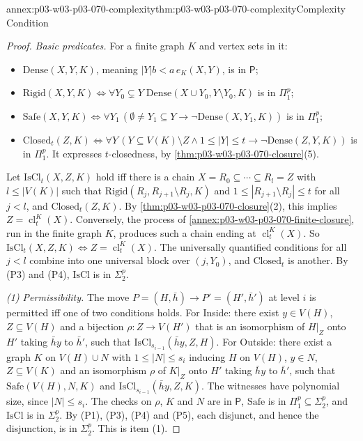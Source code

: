 \begin{annexitem}{annex:p03-w03-p03-070-complexity}{thm:p03-w03-p03-070-complexity}{Complexity Condition}
\begin{proof}
\emph{Basic predicates.}  For a finite graph \(K\) and vertex sets in it:
\begin{itemize}
\item \(\mathrm{Dense}(X,Y,K)\), meaning \(|Y|b<a\,e_K(X,Y)\), is in
      \(\mathsf P\);
\item \(\mathrm{Rigid}(X,Y,K)\iff\forall Y_0\subsetneq Y\;
      \mathrm{Dense}(X\cup Y_0,Y\setminus Y_0,K)\) is in \(\Pi^p_1\);
\item \(\mathrm{Safe}(X,Y,K)\iff\forall Y_1\,(\emptyset\neq Y_1\subseteq Y
      \to\neg\mathrm{Dense}(X,Y_1,K))\) is in \(\Pi^p_1\);
\item \(\mathrm{Closed}_t(Z,K)\iff\forall Y\,(Y\subseteq V(K)\setminus Z\wedge
      1\leq|Y|\leq t\to\neg\mathrm{Dense}(Z,Y,K))\) is in \(\Pi^p_1\).  It
      expresses \(t\)-closedness, by \cref{thm:p03-w03-p03-070-closure}(5).
\end{itemize}
Let \(\mathrm{IsCl}_t(X,Z,K)\) hold iff there is a chain
\(X=R_0\subseteq\cdots\subseteq R_l=Z\) with \(l\leq|V(K)|\) such that
\(\mathrm{Rigid}(R_j,R_{j+1}\setminus R_j,K)\) and
\(1\leq|R_{j+1}\setminus R_j|\leq t\) for all \(j<l\), and
\(\mathrm{Closed}_t(Z,K)\).  By \cref{thm:p03-w03-p03-070-closure}(2), this
implies \(Z=\operatorname{cl}^K_t(X)\).  Conversely, the process of
\cref{annex:p03-w03-p03-070-finite-closure}, run in the finite graph \(K\),
produces such a chain ending at \(\operatorname{cl}^K_t(X)\).  So
\(\mathrm{IsCl}_t(X,Z,K)\iff Z=\operatorname{cl}^K_t(X)\).  The universally
quantified conditions for all \(j<l\) combine into one universal block over
\((j,Y_0)\), and \(\mathrm{Closed}_t\) is another.  By (P3) and (P4),
\(\mathrm{IsCl}\) is in \(\Sigma^p_2\).

\emph{(1) Permissibility.}  The move \(P=(H,\bar h)\to P'=(H',\bar h')\) at
level \(i\) is permitted iff one of two conditions holds.  For Inside: there
exist \(y\in V(H)\), \(Z\subseteq V(H)\) and a bijection
\(\rho:Z\to V(H')\) that is an isomorphism of \(H|_Z\) onto \(H'\) taking
\(\bar hy\) to \(\bar h'\), such that
\(\mathrm{IsCl}_{s_{i-1}}(\bar hy,Z,H)\).  For Outside: there exist a graph
\(K\) on \(V(H)\cup N\) with \(1\leq|N|\leq s_i\) inducing \(H\) on \(V(H)\),
\(y\in N\), \(Z\subseteq V(K)\) and an isomorphism \(\rho\) of \(K|_Z\) onto
\(H'\) taking \(\bar hy\) to \(\bar h'\), such that \(\mathrm{Safe}(V(H),N,K)\)
and \(\mathrm{IsCl}_{s_{i-1}}(\bar hy,Z,K)\).  The witnesses have polynomial
size, since \(|N|\leq s_i\).  The checks on \(\rho\), \(K\) and \(N\) are in
\(\mathsf P\), \(\mathrm{Safe}\) is in \(\Pi^p_1\subseteq\Sigma^p_2\), and
\(\mathrm{IsCl}\) is in \(\Sigma^p_2\).  By (P1), (P3), (P4) and (P5), each
disjunct, and hence the disjunction, is in \(\Sigma^p_2\).  This is item (1).


\end{proof}
\end{annexitem}
